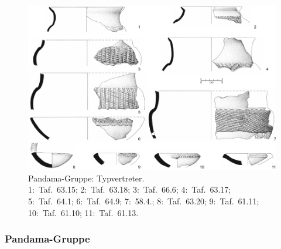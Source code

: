 \begin{figure}[tb]
	\centering
	\includegraphics[width=\textwidth]{fig/PDM-Typen.pdf}
	\caption{Pandama-Gruppe: Typvertreter.\\1:~Taf.~63.15; 2:~Taf.~63.18; 3:~Taf.~66.6; 4:~Taf.~63.17; 5:~Taf.~64.1; 6:~Taf.~64.9; 7:~58.4.; 8:~Taf.~63.20; 9:~Taf.~61.11; 10:~Taf.~61.10; 11:~Taf.~61.13.}
	\label{fig:PDM_Typvertreter}
\end{figure}

\subsubsection{Pandama-Gruppe}\label{sec:PDM-Gr}

